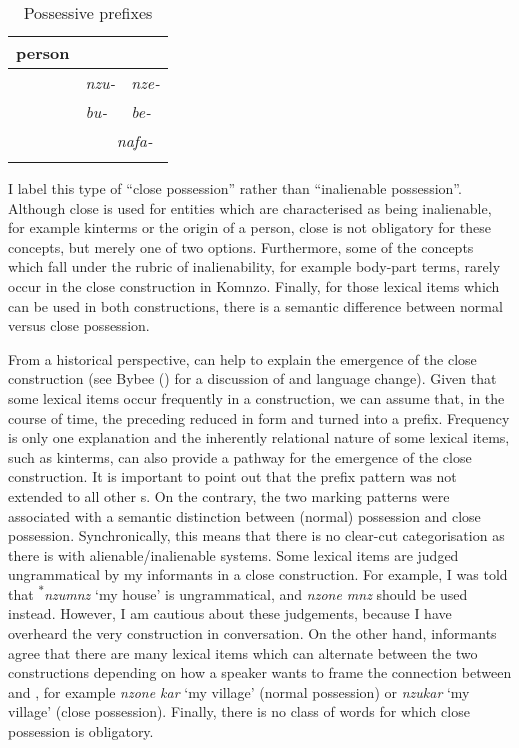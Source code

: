\begin{table}
\caption{Possessive prefixes} 
\label{posspref}
	\begin{tabularx}{.5\textwidth}{XXl}
		\lsptoprule
		{person}	&\Sg&\Nsg\\ \midrule
		\First{}&\emph{nzu-}&\emph{nze-}\\
		\Second{}&\emph{bu-}&\emph{be-}\\
		\Third&\multicolumn{2}{c}{~~~\emph{nafa-}}\\
		\lspbottomrule
	\end{tabularx}	
\end{table}%

I label this type of  ``close possession'' rather than ``inalienable possession''. Although close  is used for entities which are characterised as being inalienable, for example kinterms or the origin of a person, close  is not obligatory for these concepts, but merely one of two options. Furthermore, some of the concepts which fall under the rubric of inalienability, for example body-part terms, rarely occur in the close  construction in Komnzo. Finally, for those lexical items which can be used in both  constructions, there is a semantic difference between normal versus close possession.%

From a historical perspective,  can help to explain the emergence of the close  construction (see Bybee (\citeyear[142]{Bybee:2010wb}) for a discussion of  and language change). Given that some lexical items occur frequently in a  construction, we can assume that, in the course of time, the preceding  reduced in form and turned into a prefix. Frequency is only one explanation and the inherently relational nature of some lexical items, such as kinterms, can also provide a pathway for the emergence of the close  construction. It is important to point out that the prefix pattern was not extended to all other s. On the contrary, the two marking patterns were associated with a semantic distinction between (normal) possession and close possession. Synchronically, this means that there is no clear-cut categorisation as there is with alienable/inalienable systems. Some lexical items are judged ungrammatical by my informants in a close  construction. For example, I was told that \textsuperscript{$\ast$}\emph{nzumnz} `my house' is ungrammatical, and \emph{nzone mnz} should be used instead. However, I am cautious about these judgements, because I have overheard the very construction in conversation. On the other hand, informants agree that there are many lexical items which can alternate between the two  constructions depending on how a speaker wants to frame the connection between  and , for example \emph{nzone kar} `my village' (normal possession) or \emph{nzukar} `my village' (close possession). Finally, there is no class of words for which close possession is obligatory.%

